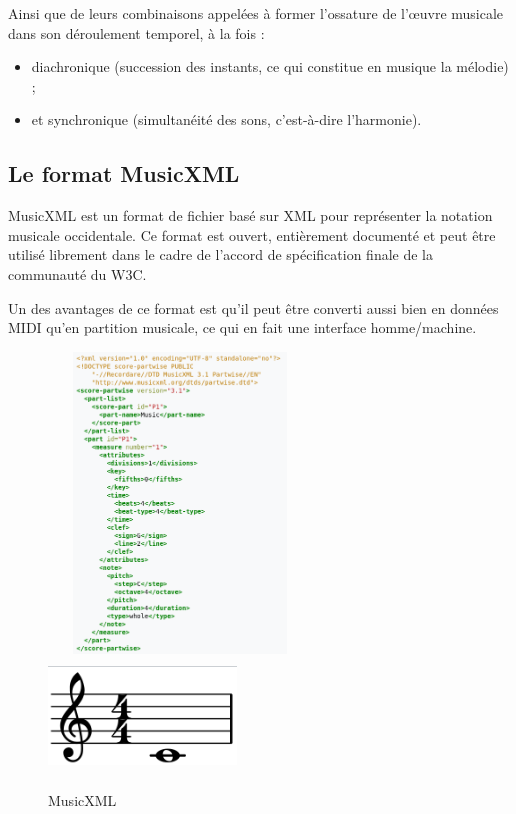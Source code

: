 Ainsi que de leurs combinaisons appelées à former l’ossature de l’œuvre musicale dans son déroulement temporel, à la fois :
\begin{itemize}
	\item diachronique (succession des instants, ce qui constitue en musique la mélodie) ;
	\item et synchronique (simultanéité des sons, c’est-à-dire l’harmonie).
\end{itemize}

\subsection*{Le format MusicXML}
MusicXML est un format de fichier basé sur XML pour représenter la notation musicale occidentale. Ce format est ouvert, entièrement documenté et peut être utilisé librement dans le cadre de l’accord de spécification finale de la communauté du W3C.

Un des avantages de ce format est qu’il peut être converti aussi bien en données MIDI qu’en partition musicale, ce qui en fait une interface homme/machine.

\begin{figure}[h]
	\centering
	\includegraphics[height=80mm, width=70mm]{
    z_images/1_contexte/6_musicxml_0.png}
    \includegraphics[height=30mm, width=50mm]{
    z_images/1_contexte/6_musicxml_1.png}
	\caption{MusicXML} 
	\label{MusicXML}
\end{figure}

